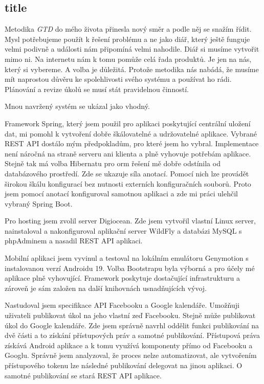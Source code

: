 \documentclass[thesis=B,czech]{FITthesis}[2012/06/26]
\newcommand{\GTD}{\textit{GTD }}
\begin{document}
\subsection{title}
\begin{conclusion}

Metodika \GTD do mého života přinesla nový směr a podle něj se snažím řídit. Mysl potřebujeme použít k řešení problému a ne jako diář, který ještě funguje velmi podivně a události nám připomíná velmi nahodile. Diář si musíme vytvořit mimo ni. Na internetu nám k tomu pomůže celá řada produktů. Je jen na nás, který si vybereme. A volba je důležitá. Protože metodika nás nabádá, že musíme mít naprostou důvěru ke spolehlivosti svého systému a používat ho rádi. Plánování a revize úkolů se musí stát pravidelnou činností.

Mnou navržený systém se ukázal jako vhodný.

Framework Spring, který jsem použil pro aplikaci poskytující centrální uložení dat, mi pomohl k vytvoření dobře škálovatelné a udržovatelné aplikace. Vybrané REST API dostálo mým předpokladům, pro které jsem ho vybral. Implementace není náročná na straně serveru ani klienta a plně vyhovuje potřebám aplikace. Stejně tak má volba Hibernatu pro \acrshort{orm} řešení mě dobře odstínila od databázového prostředí. Zde se ukazuje síla anotací. Pomocí nich lze provádět širokou škálu konfigurací bez nutnosti externích konfiguračních souborů. Proto jsem pomocí anotací konfiguroval  samotnou aplikaci a zde mi práci ulehčil vybraný Spring Boot. 

Pro hosting jsem zvolil server Digiocean. Zde jsem vytvořil vlastní Linux server, nainstaloval a nakonfiguroval aplikační server WildFly a databázi MySQL s phpAdminem a nasadil REST API aplikaci.

Mobilní aplikaci jsem vyvinul a testoval na lokálním emulátoru Genymotion s instalovanou verzí Androidu 19. Volba Bootstrapu byla výborná a pro účely mé aplikace plně vyhovující. Framework poskytuje dostačující infrastrukturu a zároveň je sám založen na další knihovnách usnadňujících vývoj. 

Nastudoval jsem specifikace API Facebooku a Google kalendáře. Umožňuji uživateli publikovat úkol na jeho vlastní zeď Facebooku. Stejně může publikovat úkol do Google kalendáře. Zde jsem správně navrhl oddělit funkci publikování na dvě části a to získání přístupových práv a samotné publikování. Přístupová práva získává Android aplikace a k tomu využívá komponenty přímo od Facebooku a Googlu. Správně jsem analyzoval, že proces nelze automatizovat, ale vytvořením přístupového tokenu lze následné publikování delegovat na jinou aplikaci. O samotné publikování se stará REST API aplikace.


\end{conclusion}
\end{document}
